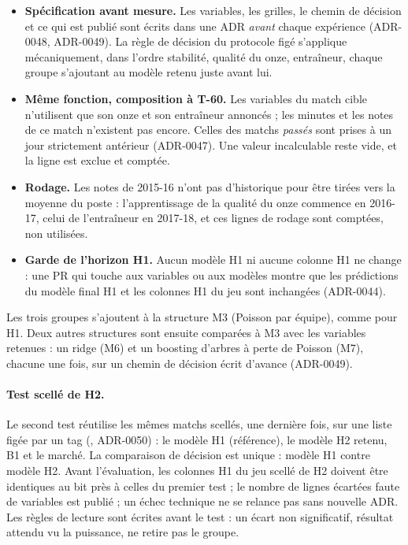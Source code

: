 \begin{itemize}
  \item \textbf{Spécification avant mesure.} Les variables, les grilles, le chemin de décision et ce qui est
        publié sont écrits dans une ADR \emph{avant} chaque expérience (ADR-0048, ADR-0049). La règle de
        décision du protocole figé s'applique mécaniquement, dans l'ordre stabilité, qualité du onze,
        entraîneur, chaque groupe s'ajoutant au modèle retenu juste avant lui.
  \item \textbf{Même fonction, composition à T-60.} Les variables du match cible n'utilisent que son onze
        et son entraîneur annoncés ; les minutes et les notes de ce match n'existent pas encore. Celles des
        matchs \emph{passés} sont prises à un jour strictement antérieur (ADR-0047). Une valeur incalculable
        reste vide, et la ligne est exclue et comptée.
  \item \textbf{Rodage.} Les notes de 2015-16 n'ont pas d'historique pour être tirées vers la moyenne du
        poste : l'apprentissage de la qualité du onze commence en 2016-17, celui de l'entraîneur en 2017-18,
        et ces lignes de rodage sont comptées, non utilisées.
  \item \textbf{Garde de l'horizon H1.} Aucun modèle H1 ni aucune colonne H1 ne change : une PR qui touche
        aux variables ou aux modèles montre que les prédictions du modèle final H1 et les colonnes H1 du jeu
        sont inchangées (ADR-0044).
\end{itemize}

Les trois groupes s'ajoutent à la structure M3 (Poisson par équipe), comme pour H1. Deux autres structures
sont ensuite comparées à M3 avec les variables retenues : un ridge (M6) et un boosting d'arbres à perte de
Poisson (M7), chacune une fois, sur un chemin de décision écrit d'avance (ADR-0049).

\paragraph{Test scellé de H2.} Le second test réutilise les mêmes matchs scellés, une dernière fois, sur une
liste figée par un tag (, ADR-0050) : le modèle H1 (référence), le modèle H2 retenu, B1
et le marché. La comparaison de décision est unique : modèle H1 contre modèle H2. Avant l'évaluation, les
colonnes H1 du jeu scellé de H2 doivent être identiques au bit près à celles du premier test ; le nombre de
lignes écartées faute de variables est publié ; un échec technique ne se relance pas sans nouvelle ADR. Les
règles de lecture sont écrites avant le test : un écart non significatif, résultat attendu vu la puissance, ne
retire pas le groupe.

